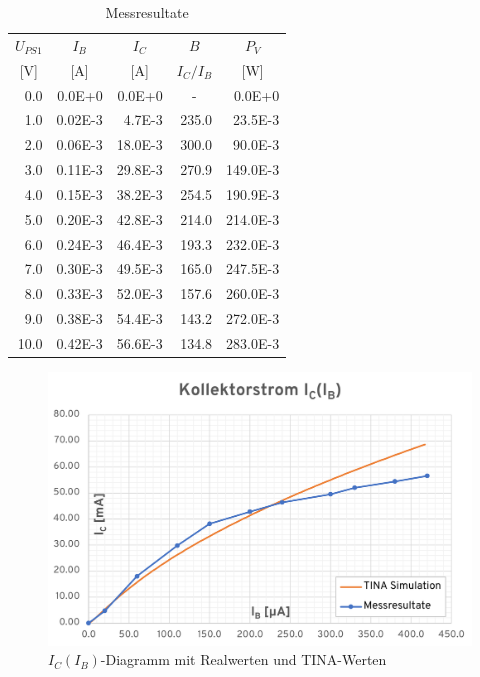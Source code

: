 \documentclass[../main.tex]{subfiles}
\begin{document}
\begin{table}[h]
\renewcommand{\arraystretch}{1.3}
\centering
\begin{tabular}{rrrrr}
\multicolumn{1}{c}{\textbf{$U_{PS1}$}} & \multicolumn{1}{c}{\textbf{$I_B$}} & \multicolumn{1}{c}{\textbf{$I_C$}} & \multicolumn{1}{c}{\textbf{$B$}} & \multicolumn{1}{c}{\textbf{$P_V$}} \\
\multicolumn{1}{c}{[$\si{\volt}$]} & \multicolumn{1}{c}{[$\si{\ampere}$]} & \multicolumn{1}{c}{[$\si{\ampere}$]} & \multicolumn{1}{c}{${I_C}/{I_B}$} & \multicolumn{1}{c}{[$\si{\watt}$]} \\ \hline
0.0 & 0.0E+0 & 0.0E+0 & \multicolumn{1}{c}{-} & 0.0E+0 \\
1.0 & 0.02E-3 & 4.7E-3 & 235.0 & 23.5E-3 \\
2.0 & 0.06E-3 & 18.0E-3 & 300.0 & 90.0E-3 \\
3.0 & 0.11E-3 & 29.8E-3 & 270.9 & 149.0E-3 \\
4.0 & 0.15E-3 & 38.2E-3 & 254.5 & 190.9E-3 \\
5.0 & 0.20E-3 & 42.8E-3 & 214.0 & 214.0E-3 \\
6.0 & 0.24E-3 & 46.4E-3 & 193.3 & 232.0E-3 \\
7.0 & 0.30E-3 & 49.5E-3 & 165.0 & 247.5E-3 \\
8.0 & 0.33E-3 & 52.0E-3 & 157.6 & 260.0E-3 \\
9.0 & 0.38E-3 & 54.4E-3 & 143.2 & 272.0E-3 \\
10.0 & 0.42E-3 & 56.6E-3 & 134.8 & 283.0E-3                          
\end{tabular}
\caption{Messresultate}
\end{table}

\begin{figure}[H]
    \centering
    \includegraphics[scale=0.8]{assets/task1_DC_amplification/task1_IC_IB.png}
    \caption{$I_C(I_B)$-Diagramm mit Realwerten und TINA-Werten}
    \label{fig:diagram_results_IC_IB}
\end{figure}
\end{document}

